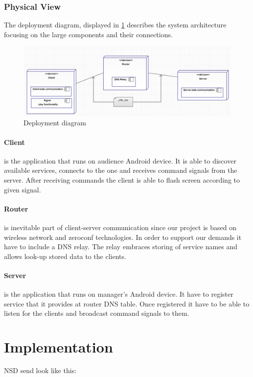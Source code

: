 \subsubsection{Physical View}
The deployment diagram, displayed in \ref{fig:deployment_diagram } describes the system architecture focusing on the large components and their connections.

\begin{figure}[H]
	\centering
		\includegraphics[width=15cm]{sprint1/deploy_diagram.png}
	\caption{Deployment diagram}
	\label{fig:deployment_diagram }
\end{figure}

\paragraph{Client}
is the application that runs on audience Android device. It is able to discover available services, connects to the one and receives command signals from the server. After receiving commands the client is able to flash screen according to given signal.

\paragraph{Router}
is inevitable part of client-server communication since our project is based on wireless network and zeroconf technologies. In order to support our demands it have to include a DNS relay. The relay embraces storing of service names and allows look-up stored data to the clients.

\paragraph{Server}
is the application that runs on manager's Android device. It have to register service that it provides at router DNS table. Once registered it have to be able to listen for the clients and broadcast command signals to them.


\section{Implementation}
NSD send look like this:


